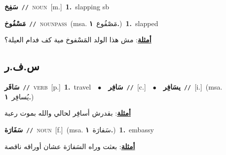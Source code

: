 \documentclass[10pt,a4paper,twoside]{article} %
\begin{document}
\begin{multicols}{2}
{\setlength\topsep{0pt}\textbf{\foreignlanguage{arabic}{سَفِخ}}\ {\color{gray}\texttt{//}\color{black}}\ \textsc{noun}\ [m.]\ \textbf{1.}~slapping sb\ } \vspace{2mm}

{\setlength\topsep{0pt}\textbf{\foreignlanguage{arabic}{مَسْفُوخ}}\ {\color{gray}\texttt{//}\color{black}}\ \textsc{noun\textunderscore pass}\ \color{gray}(msa. \foreignlanguage{arabic}{مَصْفُوع}~\foreignlanguage{arabic}{\textbf{١.}})\color{black}\ \textbf{1.}~slapped\  \begin{flushright}\color{gray}\foreignlanguage{arabic}{\textbf{\underline{\foreignlanguage{arabic}{أمثلة}}}: مش هذا الولد المَسْفوخ مية كف فدام العيلة؟}\end{flushright}\color{black}} \vspace{2mm}

\vspace{-3mm}
\subsection*{\color{blue}\foreignlanguage{arabic}{س.ف.ر}\color{blue}{}} 

{\setlength\topsep{0pt}\textbf{\foreignlanguage{arabic}{سَافَر}}\ {\color{gray}\texttt{//}\color{black}}\ \textsc{verb}\ [p.]\ \textbf{1.}~travel\ \ $\bullet$\ \ \setlength\topsep{0pt}\textbf{\foreignlanguage{arabic}{سَافِر}}\ {\color{gray}\texttt{//}\color{black}}\ [c.]\ \ $\bullet$\ \ \setlength\topsep{0pt}\textbf{\foreignlanguage{arabic}{يسَافِر}}\ {\color{gray}\texttt{//}\color{black}}\ [i.]\ \color{gray}(msa. \foreignlanguage{arabic}{يُسافِر}~\foreignlanguage{arabic}{\textbf{١.}})\color{black}\  \begin{flushright}\color{gray}\foreignlanguage{arabic}{\textbf{\underline{\foreignlanguage{arabic}{أمثلة}}}: بقدرش أسافِر لحالي والله بموت رعبة}\end{flushright}\color{black}} \vspace{2mm}

{\setlength\topsep{0pt}\textbf{\foreignlanguage{arabic}{سَفَارَة}}\ {\color{gray}\texttt{//}\color{black}}\ \textsc{noun}\ [f.]\ \color{gray}(msa. \foreignlanguage{arabic}{سَفارَة}~\foreignlanguage{arabic}{\textbf{١.}})\color{black}\ \textbf{1.}~embassy\  \begin{flushright}\color{gray}\foreignlanguage{arabic}{\textbf{\underline{\foreignlanguage{arabic}{أمثلة}}}: بعثت وراه السَفارَة عشان أوراقه ناقصة}\end{flushright}\color{black}} \vspace{2mm}


\end{multicols}
\end{document}
